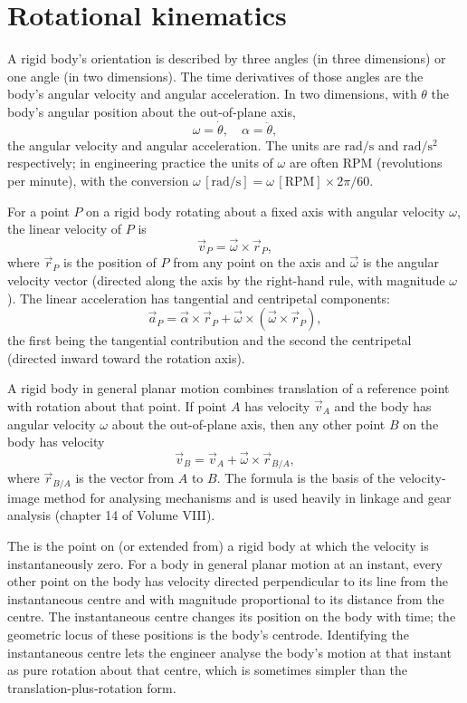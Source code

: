 

\section{Rotational kinematics}

A rigid body's orientation is described by three angles (in three
dimensions) or one angle (in two dimensions). The time derivatives
of those angles are the body's angular velocity and angular
acceleration. In two dimensions, with $\theta$ the body's angular
position about the out-of-plane axis,
\[
\omega = \dot{\theta}, \quad \alpha = \ddot{\theta},
\]
the angular velocity and angular acceleration. The units are
$\si{\radian\per\second}$ and $\si{\radian\per\second\squared}$
respectively; in engineering practice the units of $\omega$ are often
RPM (revolutions per minute), with the conversion $\omega \,[\si{
\radian\per\second}] = \omega \,[\text{RPM}] \times 2\pi / 60$.

For a point $P$ on a rigid body rotating about a fixed axis with
angular velocity $\omega$, the linear velocity of $P$ is
\[
\vec{v}_P = \vec{\omega} \times \vec{r}_P,
\]
where $\vec{r}_P$ is the position of $P$ from any point on the axis
and $\vec{\omega}$ is the angular velocity vector (directed along the
axis by the right-hand rule, with magnitude $\omega$). The linear
acceleration has tangential and centripetal components:
\[
\vec{a}_P = \vec{\alpha} \times \vec{r}_P + \vec{\omega} \times
(\vec{\omega} \times \vec{r}_P),
\]
the first being the tangential contribution and the second the
centripetal (directed inward toward the rotation axis).

A rigid body in general planar motion combines translation of a
reference point with rotation about that point. If point $A$ has
velocity $\vec{v}_A$ and the body has angular velocity $\omega$ about
the out-of-plane axis, then any other point $B$ on the body has
velocity
\[
\vec{v}_B = \vec{v}_A + \vec{\omega} \times \vec{r}_{B/A},
\]
where $\vec{r}_{B/A}$ is the vector from $A$ to $B$. The formula
is the basis of the velocity-image method for analysing mechanisms
and is used heavily in linkage and gear analysis (chapter 14 of
Volume VIII).

The  is the point on (or
extended from) a rigid body at which the velocity is instantaneously
zero. For a body in general planar motion at an instant, every other
point on the body has velocity directed perpendicular to its line
from the instantaneous centre and with magnitude proportional to its
distance from the centre. The instantaneous centre changes its
position on the body with time; the geometric locus of these
positions is the body's centrode. Identifying the instantaneous
centre lets the engineer analyse the body's motion at that instant
as pure rotation about that centre, which is sometimes simpler than
the translation-plus-rotation form.

